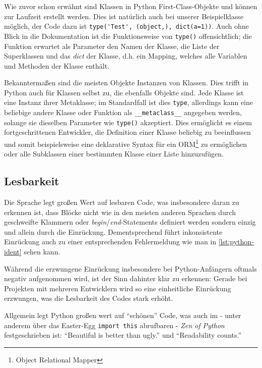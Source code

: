 Wie zuvor schon erwähnt sind Klassen in Python First-Class-Objekte und können zur Laufzeit erstellt
werden. Dies ist natürlich auch bei unserer Beispielklasse möglich, der Code dazu ist
\lstinline{type('Test', (object,), dict(a=1))}.
Auch ohne Blick in die Dokumentation ist die Funktionsweise von \lstinline{type()} offensichtlich;
die Funktion erwartet als Parameter den Namen der Klasse, die Liste der Superklassen und das
\emph{dict} der Klasse, d.h. ein Mapping, welches alle Variablen und Methoden der Klasse enthält.

Bekanntermaßen sind die meisten Objekte Instanzen von Klassen. Dies trifft in Python auch für
Klassen selbst zu, die ebenfalls Objekte sind. Jede Klasse ist eine Instanz ihrer Metaklasse; im
Standardfall ist dies \lstinline{type}, allerdings kann eine beliebige andere Klasse oder Funktion
als \lstinline{__metaclass__} angegeben werden, solange sie dieselben Parameter wie
\lstinline{type()} akzeptiert. Dies ermöglicht es einem fortgeschrittenen Entwickler, die Definition
einer Klasse beliebig zu beeinflussen und somit beispielsweise eine deklarative Syntax für ein
ORM\footnote{Object Relational Mapper} zu ermöglichen oder alle Subklassen einer bestimmten Klasse
einer Liste hinzuzufügen.



\subsection{Lesbarkeit}

Die Sprache legt großen Wert auf lesbaren Code, was insbesondere daran zu erkennen ist, dass Blöcke
nicht wie in den meisten anderen Sprachen durch geschweifte Klammern oder
\emph{begin}/\emph{end}-Statements definiert werden sondern einzig und allein durch die Einrückung.
Dementsprechend führt inkonsistente Einrückung auch zu einer entsprechenden Fehlermeldung wie man in
\autoref{lst:python-ident} sehen kann.

Während die erzwungene Einrückung insbesondere bei Python-Anfängern oftmals negativ aufgenommen
wird, ist der Sinn dahinter klar zu erkennen: Gerade bei Projekten mit mehreren Entwicklern wird so
eine einheitliche Einrückung erzwungen, was die Lesbarkeit des Codes stark erhöht.

Allgemein legt Python großen wert auf \enquote{schönen} Code, was auch im - unter anderem über das
Easter-Egg \lstinline{import this} abrufbaren - \emph{Zen of Python} festgeschrieben ist:
\enquote{Beautiful is better than ugly.} und \enquote{Readability counts.} \citep{zenofpython}

